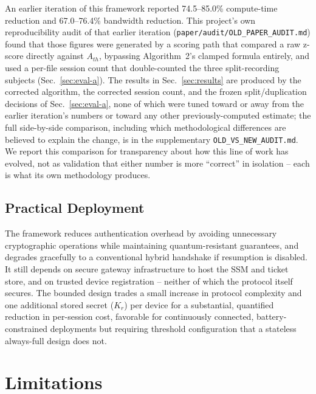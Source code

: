 \documentclass[conference]{IEEEtran}
\begin{document}
An earlier iteration of this framework reported 74.5--85.0\% compute-time
reduction and 67.0--76.4\% bandwidth reduction. This project's own
reproducibility audit of that earlier iteration
(\texttt{paper/audit/OLD\_PAPER\_AUDIT.md}) found that those figures were
generated by a scoring path that compared a raw z-score directly against
$A_{th}$, bypassing Algorithm~2's clamped formula entirely, and used a
per-file session count that double-counted the three split-recording
subjects (Sec.~\ref{sec:eval-a}). The results in Sec.~\ref{sec:results} are
produced by the corrected algorithm, the corrected session count, and the
frozen split/duplication decisions of Sec.~\ref{sec:eval-a}, none of which
were tuned toward or away from the earlier iteration's numbers or toward
any other previously-computed estimate; the full side-by-side comparison,
including which methodological differences are believed to explain the
change, is in the supplementary \texttt{OLD\_VS\_NEW\_AUDIT.md}. We report
this comparison for transparency about how this line of work has evolved,
not as validation that either number is more ``correct'' in isolation --
each is what its own methodology produces.

\subsection{Practical Deployment}

The framework reduces authentication overhead by avoiding unnecessary
cryptographic operations while maintaining quantum-resistant guarantees,
and degrades gracefully to a conventional hybrid handshake if resumption is
disabled. It still depends on secure gateway infrastructure to host the SSM
and ticket store, and on trusted device registration -- neither of which
the protocol itself secures. The bounded design trades a small increase in
protocol complexity and one additional stored secret ($K_r$) per device for
a substantial, quantified reduction in per-session cost, favorable for
continuously connected, battery-constrained deployments but requiring
threshold configuration that a stateless always-full design does not.

\section{Limitations}
\label{sec:limits}
\end{document}
